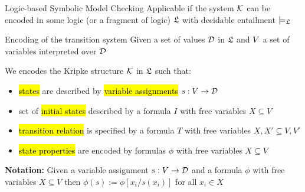 
\begin{frame}{Logic-based Symbolic Model Checking}
Applicable if the system ${\cal K}$ can be encoded in some logic (or a fragment
of logic) $\mathfrak{L}$ with decidable entailment $\models_{\mathfrak{L}}$

\bigskip
{}

\bigskip
{}

\bigskip
{}
\end{frame}


\begin{frame}{Encoding of the transition system}
Given a set of values $\mathcal{D}$ in $\mathfrak{L}$ and $V$ a set of variables
interpreted over $\mathcal{D}$

\bigskip
We encodes the Kripke structure ${\cal K}$ in $\mathfrak{L}$ such that:
\begin{itemize}
  \item \hl{states} are described by \hl{variable assignments}
  $s:V \rightarrow \mathcal{D}$
  
  \item set of \hl{initial states} described by a formula $I$ with
  free variables $X \subseteq V$
  
  \item \hl{transition relation} is specified by a formula $T$ with free
  variables $X, X' \subseteq V, V'$ 
  
  \item \hl{state properties} are encoded by formulas $\phi$ with free
  variables $X \subseteq V$
\end{itemize}

\bigskip
\textbf{Notation:} Given a variable assignment $s: V \rightarrow \mathcal{D}$ 
and a formula $\phi$ with
free variables $X \subseteq V$ then $\phi(s) := \phi[x_i/s(x_i)]$ for all
$x_i \in X$
\end{frame}

